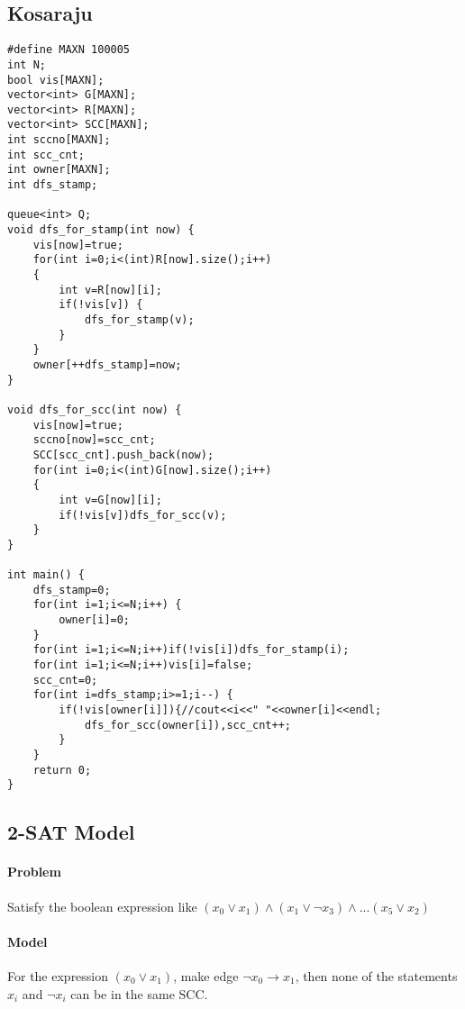 \subsection{Kosaraju}
\begin{lstlisting}
#define MAXN 100005
int N;
bool vis[MAXN];
vector<int> G[MAXN];
vector<int> R[MAXN];
vector<int> SCC[MAXN];
int sccno[MAXN];
int scc_cnt;
int owner[MAXN];
int dfs_stamp;

queue<int> Q;
void dfs_for_stamp(int now) {
	vis[now]=true;
	for(int i=0;i<(int)R[now].size();i++)
	{
		int v=R[now][i];
		if(!vis[v]) {
			dfs_for_stamp(v);
		}
	}
	owner[++dfs_stamp]=now;
}

void dfs_for_scc(int now) {
	vis[now]=true;
	sccno[now]=scc_cnt;
	SCC[scc_cnt].push_back(now);
	for(int i=0;i<(int)G[now].size();i++)
	{
		int v=G[now][i];
		if(!vis[v])dfs_for_scc(v);
	}
}

int main() {
	dfs_stamp=0;
	for(int i=1;i<=N;i++) {
		owner[i]=0;
	}
	for(int i=1;i<=N;i++)if(!vis[i])dfs_for_stamp(i);
	for(int i=1;i<=N;i++)vis[i]=false;
	scc_cnt=0;
	for(int i=dfs_stamp;i>=1;i--) {
		if(!vis[owner[i]]){//cout<<i<<" "<<owner[i]<<endl;
			dfs_for_scc(owner[i]),scc_cnt++;
		}
	}
    return 0;
}
\end{lstlisting}
\subsection{2-SAT Model}
\paragraph{Problem}
Satisfy the boolean expression like $(x_0 \lor x_1) \land (x_1 \lor \neg x_3)\land ... (x_5 \lor x_2)$
\paragraph{Model}
For the expression $(x_0 \lor x_1)$, make edge $\neg x_0 \rightarrow x_1$, then none of the statements $x_i$ and $\neg x_i$ can be in the same SCC.
